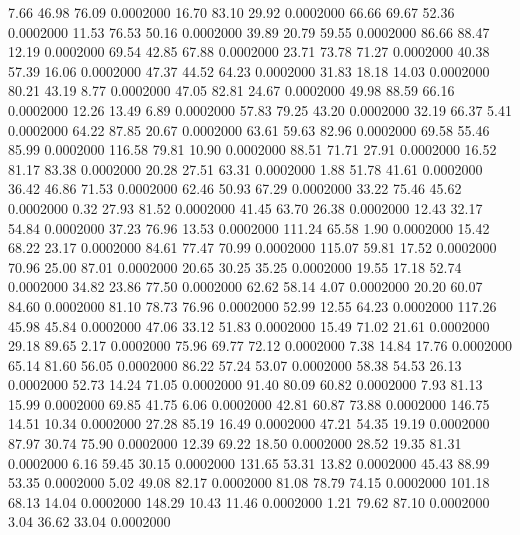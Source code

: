    7.66   46.98   76.09   0.0002000
  16.70   83.10   29.92   0.0002000
  66.66   69.67   52.36   0.0002000
  11.53   76.53   50.16   0.0002000
  39.89   20.79   59.55   0.0002000
  86.66   88.47   12.19   0.0002000
  69.54   42.85   67.88   0.0002000
  23.71   73.78   71.27   0.0002000
  40.38   57.39   16.06   0.0002000
  47.37   44.52   64.23   0.0002000
  31.83   18.18   14.03   0.0002000
  80.21   43.19    8.77   0.0002000
  47.05   82.81   24.67   0.0002000
  49.98   88.59   66.16   0.0002000
  12.26   13.49    6.89   0.0002000
  57.83   79.25   43.20   0.0002000
  32.19   66.37    5.41   0.0002000
  64.22   87.85   20.67   0.0002000
  63.61   59.63   82.96   0.0002000
  69.58   55.46   85.99   0.0002000
 116.58   79.81   10.90   0.0002000
  88.51   71.71   27.91   0.0002000
  16.52   81.17   83.38   0.0002000
  20.28   27.51   63.31   0.0002000
   1.88   51.78   41.61   0.0002000
  36.42   46.86   71.53   0.0002000
  62.46   50.93   67.29   0.0002000
  33.22   75.46   45.62   0.0002000
   0.32   27.93   81.52   0.0002000
  41.45   63.70   26.38   0.0002000
  12.43   32.17   54.84   0.0002000
  37.23   76.96   13.53   0.0002000
 111.24   65.58    1.90   0.0002000
  15.42   68.22   23.17   0.0002000
  84.61   77.47   70.99   0.0002000
 115.07   59.81   17.52   0.0002000
  70.96   25.00   87.01   0.0002000
  20.65   30.25   35.25   0.0002000
  19.55   17.18   52.74   0.0002000
  34.82   23.86   77.50   0.0002000
  62.62   58.14    4.07   0.0002000
  20.20   60.07   84.60   0.0002000
  81.10   78.73   76.96   0.0002000
  52.99   12.55   64.23   0.0002000
 117.26   45.98   45.84   0.0002000
  47.06   33.12   51.83   0.0002000
  15.49   71.02   21.61   0.0002000
  29.18   89.65    2.17   0.0002000
  75.96   69.77   72.12   0.0002000
   7.38   14.84   17.76   0.0002000
  65.14   81.60   56.05   0.0002000
  86.22   57.24   53.07   0.0002000
  58.38   54.53   26.13   0.0002000
  52.73   14.24   71.05   0.0002000
  91.40   80.09   60.82   0.0002000
   7.93   81.13   15.99   0.0002000
  69.85   41.75    6.06   0.0002000
  42.81   60.87   73.88   0.0002000
 146.75   14.51   10.34   0.0002000
  27.28   85.19   16.49   0.0002000
  47.21   54.35   19.19   0.0002000
  87.97   30.74   75.90   0.0002000
  12.39   69.22   18.50   0.0002000
  28.52   19.35   81.31   0.0002000
   6.16   59.45   30.15   0.0002000
 131.65   53.31   13.82   0.0002000
  45.43   88.99   53.35   0.0002000
   5.02   49.08   82.17   0.0002000
  81.08   78.79   74.15   0.0002000
 101.18   68.13   14.04   0.0002000
 148.29   10.43   11.46   0.0002000
   1.21   79.62   87.10   0.0002000
   3.04   36.62   33.04   0.0002000
